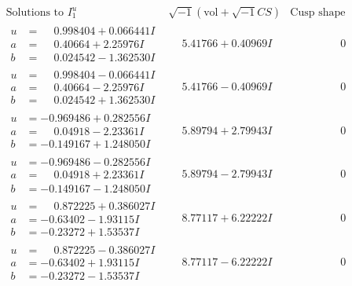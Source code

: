\documentclass[1p]{elsarticle_modified}
\theoremstyle{definition}
\newcommand{\I}{\sqrt{-1}}
\begin{document}
$$\begin{array}{c|c|c}  
\text{Solutions to }I^u_{1}& \I (\text{vol} + \sqrt{-1}CS) & \text{Cusp shape}\\
 \hline 
\begin{aligned}
u &= \phantom{-}0.998404 + 0.066441 I \\
a &= \phantom{-}0.40664 + 2.25976 I \\
b &= \phantom{-}0.024542 - 1.362530 I\end{aligned}
 & \phantom{-}5.41766 + 0.40969 I & \phantom{-0.000000 } 0 \\ \hline\begin{aligned}
u &= \phantom{-}0.998404 - 0.066441 I \\
a &= \phantom{-}0.40664 - 2.25976 I \\
b &= \phantom{-}0.024542 + 1.362530 I\end{aligned}
 & \phantom{-}5.41766 - 0.40969 I & \phantom{-0.000000 } 0 \\ \hline\begin{aligned}
u &= -0.969486 + 0.282556 I \\
a &= \phantom{-}0.04918 - 2.23361 I \\
b &= -0.149167 + 1.248050 I\end{aligned}
 & \phantom{-}5.89794 + 2.79943 I & \phantom{-0.000000 } 0 \\ \hline\begin{aligned}
u &= -0.969486 - 0.282556 I \\
a &= \phantom{-}0.04918 + 2.23361 I \\
b &= -0.149167 - 1.248050 I\end{aligned}
 & \phantom{-}5.89794 - 2.79943 I & \phantom{-0.000000 } 0 \\ \hline\begin{aligned}
u &= \phantom{-}0.872225 + 0.386027 I \\
a &= -0.63402 - 1.93115 I \\
b &= -0.23272 + 1.53537 I\end{aligned}
 & \phantom{-}8.77117 + 6.22222 I & \phantom{-0.000000 } 0 \\ \hline\begin{aligned}
u &= \phantom{-}0.872225 - 0.386027 I \\
a &= -0.63402 + 1.93115 I \\
b &= -0.23272 - 1.53537 I\end{aligned}
 & \phantom{-}8.77117 - 6.22222 I & \phantom{-0.000000 } 0 \\ \hline\begin{aligned}

\end{aligned}
\end{array}$$
\end{document}
